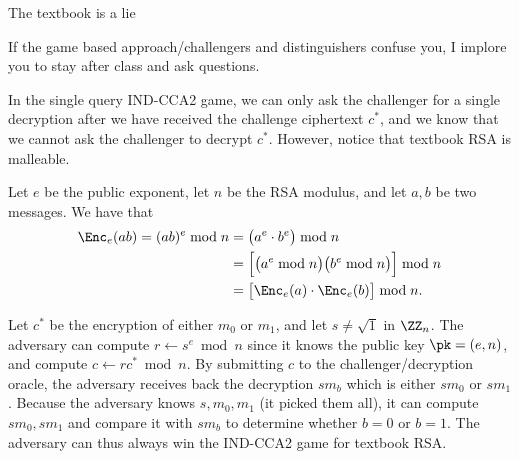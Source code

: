 \documentclass{practice}
\begin{document}
\begin{task}{The textbook is a lie}
  \begin{tcolorbox}[title=Note]
    If the game based approach/challengers and distinguishers confuse you, I implore you to stay after class and ask questions.
  \end{tcolorbox}

  In the single query IND-CCA2 game, we can only ask the challenger for a single decryption after we have received the challenge ciphertext $c^*$, and we know that we cannot ask the challenger to decrypt $c^*$.
  However, notice that textbook RSA is malleable.

  Let $e$ be the public exponent, let $n$ be the RSA modulus, and let $a, b$ be two messages.
  We have that
  \begin{align*}
    \Enc_e(ab) = (ab)^e\bmod{n} &= \bigl(a^e\cdot b^e\bigr)\bmod{n}\\
    &= \Bigl[\bigl(a^e\bmod{n}\bigr)\bigl(b^e \bmod{n}\bigr)\Bigr]\bmod{n}\\
    &= \bigl[\Enc_e(a) \cdot \Enc_e(b)\bigr]\bmod{n}.
  \end{align*}

  Let $c^*$ be the encryption of either $m_0$ or $m_1$, and let $s \neq \sqrt{1}$ in $\ZZ_n$.
  The adversary can compute $r \gets s^e \bmod{n}$ since it knows the public key $\pk=(e, n)$, and compute $c \gets rc^* \bmod{n}$.
  By submitting $c$ to the challenger/decryption oracle, the adversary receives back the decryption $sm_b$ which is either $sm_0$ or $sm_1$.
  Because the adversary knows $s, m_0, m_1$ (it picked them all), it can compute $sm_0, sm_1$ and compare it with $sm_b$ to determine whether $b=0$ or $b=1$.
  The adversary can thus always win the IND-CCA2 game for textbook RSA.
\end{task}
\end{document}
